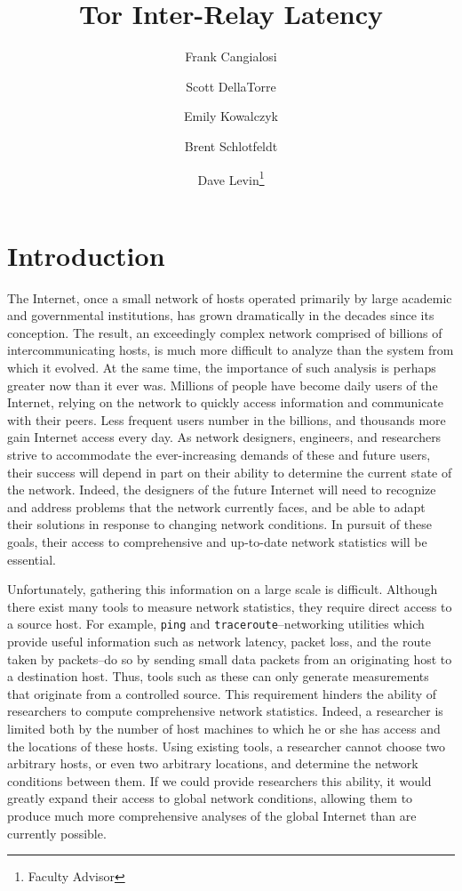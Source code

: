 \documentclass[twocolumn,11pt]{article}
\title{Tor Inter-Relay Latency}
\author[1]{Frank Cangialosi}
\author[1]{Scott DellaTorre}
\author[1]{Emily Kowalczyk}
\author[1]{Brent Schlotfeldt}
\author[1]{Dave Levin\thanks{Faculty Advisor}}
\affil[1]{University of Maryland}
\date{}
\begin{document}
\maketitle

\section {Introduction}

The Internet, once a small network of hosts operated primarily by large academic and governmental institutions, has grown dramatically in the decades since its conception. The result, an exceedingly complex network comprised of billions of intercommunicating hosts, is much more difficult to analyze than the system from which it evolved. At the same time, the importance of such analysis is perhaps greater now than it ever was. Millions of people have become daily users of the Internet, relying on the network to quickly access information and communicate with their peers. Less frequent users number in the billions, and thousands more gain Internet access every day. As network designers, engineers, and researchers strive to accommodate the ever-increasing demands of these and future users, their success will depend in part on their ability to determine the current state of the network. Indeed, the designers of the future Internet will need to recognize and address problems that the network currently faces, and be able to adapt their solutions in response to changing network conditions. In pursuit of these goals, their access to comprehensive and up-to-date network statistics will be essential.
	
Unfortunately, gathering this information on a large scale is difficult. Although there exist many tools to measure network statistics, they require direct access to a source host. For example, \texttt{ping} and \texttt{traceroute}--networking utilities which provide useful information such as network latency, packet loss, and the route taken by packets--do so by sending small data packets from an originating host to a destination host. Thus, tools such as these can only generate measurements that originate from a controlled source. This requirement hinders the ability of  researchers to compute comprehensive network statistics. Indeed, a researcher is limited both by the number of host machines to which he or she has access and the locations of these hosts. Using existing tools, a researcher cannot choose two arbitrary hosts, or even two arbitrary locations, and determine the network conditions between them. If we could provide researchers this ability, it would greatly expand their access to global network conditions, allowing them to produce much more comprehensive analyses of the global Internet than are currently possible.
\end{document}
